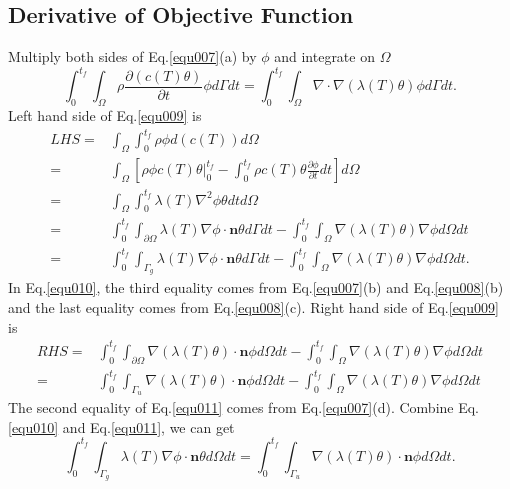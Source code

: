 \documentclass[UTF-8]{article}
\begin{document}
\subsection{Derivative of Objective Function}
Multiply both sides of Eq.\ref{equ007}(a) by $\phi$ and integrate on $\Omega$
\begin{equation}\label{equ009}
	\int_{0}^{t_f} \int_\Omega \rho \frac{\partial \left( c(T) \theta \right)}{\partial t} \phi d\Gamma dt = \int_0^{t_f} \int_\Omega \nabla \cdot \nabla \left( \lambda(T) \theta \right) \phi d\Gamma dt.
\end{equation}
Left hand side of Eq.\ref{equ009} is
\begin{align}\label{equ010}
	LHS =& \int_\Omega \int_0^{t_f} \rho \phi d\left(c(T)\right) d\Omega \nonumber \\
	=& \int_\Omega \left[ \rho \phi c(T) \theta \Big|_0^{t_f} - \int_{0}^{t_f} \rho c(T) \theta \frac{\partial \phi}{\partial t} dt \right] d\Omega \nonumber \\
	=& \int_\Omega \int_{0}^{t_f} \lambda(T) \nabla^2\phi \theta dt d\Omega \nonumber \\
	=& \int_0^{t_f}\int_{\partial \Omega} \lambda(T) \nabla\phi \cdot \pmb{n} \theta d\Gamma dt - \int_{0}^{t_f} \int_\Omega \nabla \left( \lambda(T) \theta \right) \nabla \phi d\Omega dt \nonumber \\
	=& \int_0^{t_f}\int_{\Gamma_g} \lambda(T) \nabla\phi \cdot \pmb{n} \theta d\Gamma dt - \int_{0}^{t_f} \int_\Omega \nabla \left( \lambda(T) \theta \right) \nabla \phi d\Omega dt.
\end{align}
In Eq.\ref{equ010}, the third equality comes from Eq.\ref{equ007}(b) and Eq.\ref{equ008}(b) and the last equality comes from Eq.\ref{equ008}(c). Right hand side of Eq.\ref{equ009} is
\begin{align}\label{equ011}
	RHS =& \int_{0}^{t_f} \int_{\partial \Omega} \nabla \left( \lambda(T) \theta \right) \cdot \pmb{n} \phi d\Omega dt - \int_{0}^{t_f} \int_\Omega \nabla \left( \lambda(T) \theta \right) \nabla \phi d\Omega dt \nonumber \\
	=& \int_{0}^{t_f} \int_{\Gamma_u} \nabla \left( \lambda(T) \theta \right) \cdot \pmb{n} \phi d\Omega dt - \int_{0}^{t_f} \int_\Omega \nabla \left( \lambda(T) \theta \right) \nabla \phi d\Omega dt
\end{align}
The second equality of Eq.\ref{equ011} comes from Eq.\ref{equ007}(d). Combine Eq.\ref{equ010} and Eq.\ref{equ011}, we can get
\begin{equation*}
	\int_{0}^{t_f}\int_{\Gamma_g} \lambda(T) \nabla\phi \cdot \pmb{n} \theta d\Omega dt = \int_{0}^{t_f} \int_{\Gamma_u} \nabla\left( \lambda(T) \theta \right) \cdot \pmb{n} \phi d\Omega dt.
\end{equation*}
\end{document}
